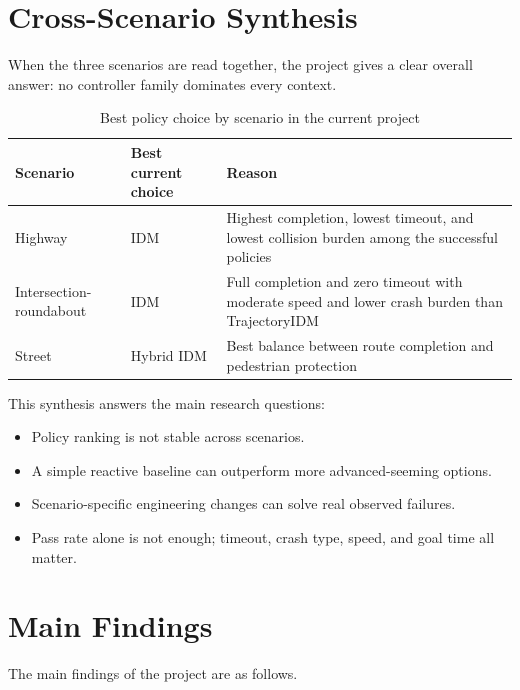 \documentclass[12pt,a4paper]{report}
\begin{document}
\section{Cross-Scenario Synthesis}
When the three scenarios are read together, the project gives a clear overall answer: no controller family dominates every context.

\begin{table}[H]
    \centering
    \footnotesize
    \setlength{\tabcolsep}{4pt}
    \renewcommand{\arraystretch}{1.12}
    \caption{Best policy choice by scenario in the current project}
    \label{tab:best_policy_by_scenario}
    \begin{tabularx}{\textwidth}{>{\raggedright\arraybackslash}p{2.7cm} >{\raggedright\arraybackslash}p{2.6cm} X}
        \toprule
        Scenario & Best current choice & Reason \\
        \midrule
        Highway & IDM & Highest completion, lowest timeout, and lowest collision burden among the successful policies \\
        Intersection-roundabout & IDM & Full completion and zero timeout with moderate speed and lower crash burden than TrajectoryIDM \\
        Street & Hybrid IDM & Best balance between route completion and pedestrian protection \\
        \bottomrule
    \end{tabularx}
\end{table}

This synthesis answers the main research questions:

\begin{itemize}
    \item Policy ranking is not stable across scenarios.
    \item A simple reactive baseline can outperform more advanced-seeming options.
    \item Scenario-specific engineering changes can solve real observed failures.
    \item Pass rate alone is not enough; timeout, crash type, speed, and goal time all matter.
\end{itemize}

\section{Main Findings}
The main findings of the project are as follows.
\end{document}

